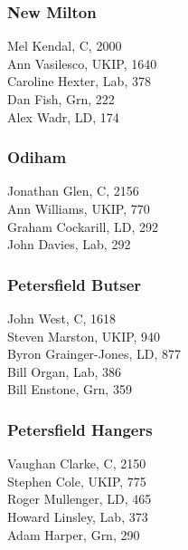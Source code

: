 \documentclass[a4paper,openany,10pt]{book}
\begin{document}
\subsubsection*{New Milton}



Mel Kendal, C, 2000\\
Ann Vasilesco, UKIP, 1640\\
Caroline Hexter, Lab, 378\\
Dan Fish, Grn, 222\\
Alex Wadr, LD, 174\\


\subsubsection*{Odiham}



Jonathan Glen, C, 2156\\
Ann Williams, UKIP, 770\\
Graham Cockarill, LD, 292\\
John Davies, Lab, 292\\


\subsubsection*{Petersfield Butser}



John West, C, 1618\\
Steven Marston, UKIP, 940\\
Byron Grainger-Jones, LD, 877\\
Bill Organ, Lab, 386\\
Bill Enstone, Grn, 359\\


\subsubsection*{Petersfield Hangers}



Vaughan Clarke, C, 2150\\
Stephen Cole, UKIP, 775\\
Roger Mullenger, LD, 465\\
Howard Linsley, Lab, 373\\
Adam Harper, Grn, 290\\
\end{document}
